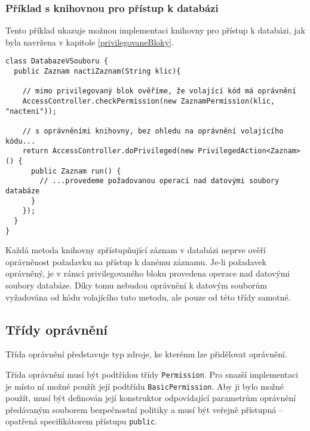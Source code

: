 \subsubsection{Příklad s knihovnou pro přístup k databázi}\label{databazeVsouboru}

Tento příklad ukazuje možnou implementaci knihovny pro přístup k databázi, jak byla navržena v kapitole \ref{privilegovaneBloky}.

\begin{verbatim}
class DatabazeVSouboru {
  public Zaznam nactiZaznam(String klic){
    
    // mimo privilegovaný blok ověříme, že volající kód má oprávnění
    AccessController.checkPermission(new ZaznamPermission(klic, "nacteni"));
    
    // s oprávněními knihovny, bez ohledu na oprávnění volajícího kódu...
    return AccessController.doPrivileged(new PrivilegedAction<Zaznam>() {
      public Zaznam run() {
        // ...provedeme požadovanou operaci nad datovými soubory databáze
      }
    });
  }
}
\end{verbatim}

Každá metoda knihovny zpřístupňující záznam v databázi neprve ověří oprávněnost požadavku na přístup k danému záznamu.
Je-li požadavek oprávněný, je v rámci privilegovaného bloku provedena operace nad datovými soubory databáze.
Díky tomu nebudou oprávnění k datovým souborům vyžadována od kódu volajícího tuto metodu, ale pouze od této třídy samotné.

\subsection{Třídy oprávnění}

Třída oprávnění představuje typ zdroje, ke kterému lze přidělovat oprávnění.

Třída oprávnění musí být podtřídou třídy {\tt Permission}. Pro snazší implementaci je místo ní možné použít její podtřídu {\tt BasicPermission}.
Aby ji bylo možné použít, musí být definován její konstruktor odpovídající parametrům oprávnění předávaným souborem bezpečnostní politiky a musí být veřejně přístupná -- opatřená specifikátorem přístupu {\tt public}.

